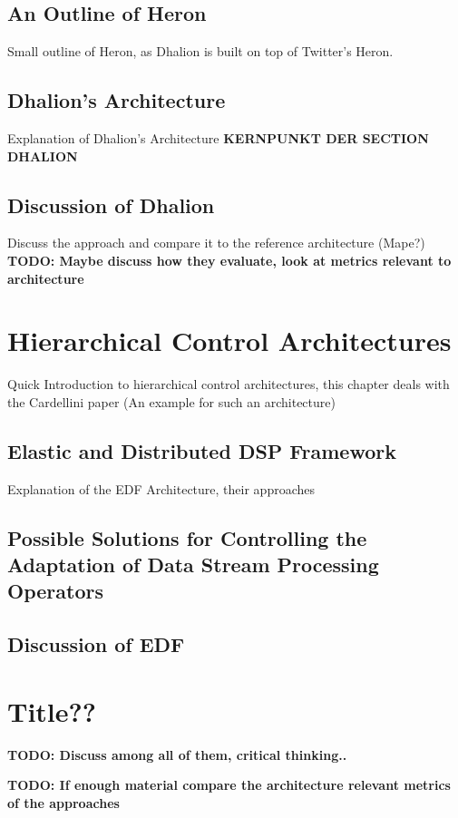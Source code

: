         \subsection{An Outline of Heron}
        Small outline of Heron, as Dhalion is built on top of Twitter's Heron.

        \subsection{Dhalion's Architecture}
        Explanation of Dhalion's Architecture \textbf{KERNPUNKT DER SECTION DHALION}

        \subsection{Discussion of Dhalion}
        Discuss the approach and compare it to the reference architecture (Mape?)
        \textbf{TODO: Maybe discuss how they evaluate, look at metrics relevant to architecture}

    \section{Hierarchical Control Architectures}
    Quick Introduction to hierarchical control architectures, this chapter deals with the Cardellini
    paper (An example for such an architecture)

        \subsection{Elastic and Distributed DSP Framework}
        Explanation of the EDF Architecture, their approaches

        \subsection{Possible Solutions for Controlling the Adaptation of Data Stream Processing Operators}

        \subsection{Discussion of EDF}

    \section{Title??}
    \textbf{TODO: Discuss among all of them, critical thinking..}

    \textbf{TODO: If enough material compare the architecture relevant metrics of the approaches}
